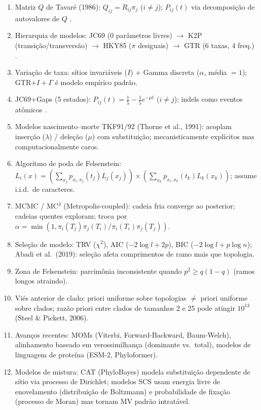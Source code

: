 \clearpage
\begin{revise}\small
\begin{enumerate}[itemsep=0pt, topsep=0pt, parsep=0pt]
    \item Matriz $Q$ de Tavaré (1986): $Q_{ij}=R_{ij}\pi_j$ ($i\neq j$); $P_{ij}(t)$ via decomposição de autovalores de $Q$ \parencite{tavare1986,yang1994}.
    \item Hierarquia de modelos: JC69 (0 parâmetros livres) $\to$ K2P (transição/transversão) $\to$ HKY85 ($\pi$ desiguais) $\to$ GTR (6 taxas, 4 freq.) \parencite{swofford1996}.
    \item Variação de taxa: sítios invariáveis ($I$) + Gamma discreta ($\alpha$, média $=1$); GTR$+I+\Gamma$ é modelo empírico padrão.
    \item JC69+Gaps (5 estados): $P_{ij}(t)=\frac{1}{5}-\frac{1}{5}e^{-\mu t}$ ($i\neq j$); indels como eventos atômicos \parencite{wheeler2006}.
    \item Modelos nascimento--morte TKF91/92 (Thorne et al., 1991): acoplam inserção ($\lambda$) / deleção ($\mu$) com substituição; mecanisticamente explícitos mas computacionalmente caros.
    \item Algoritmo de poda de Felsenstein: $L_i(x)=\left(\sum_{x_j}p_{x_i,x_j}(t_j)L_j(x_j)\right)\!\times\!\left(\sum_{x_k}p_{x_i,x_k}(t_k)L_k(x_k)\right)$; assume i.i.d.\ de caracteres.
    \item MCMC / MC$^3$ (Metropolis-coupled): cadeia fria converge ao posterior; cadeias quentes exploram; troca por $\alpha=\min(1,\pi_i(T_j)\pi_j(T_i)/\pi_i(T_i)\pi_j(T_j))$.
    \item Seleção de modelo: TRV ($\chi^2$), AIC ($-2\log l+2p$), BIC ($-2\log l+p\log n$); Abadi et al.\ (2019): seleção afeta comprimentos de ramo mais que topologia.
    \item Zona de Felsenstein: parcimônia inconsistente quando $p^2\geq q(1-q)$ (ramos longos atraindo).
    \item Viés anterior de clado: priori uniforme sobre topologias $\neq$ priori uniforme sobre clados; razão priori entre clados de tamanhos 2 e 25 pode atingir $10^{13}$ (Steel \& Pickett, 2006).
    \item Avanços recentes: MOMs (Viterbi, Forward-Backward, Baum-Welch), alinhamento baseado em verossimilhança (dominante vs.\ total), modelos de linguagem de proteína (ESM-2, Phyloformer).
    \item Modelos de mistura: CAT (PhyloBayes) modela substituição dependente de sítio via processo de Dirichlet; modelos SCS usam energia livre de enovelamento (distribuição de Boltzmann) e probabilidade de fixação (processo de Moran) mas tornam MV padrão intratável.

\end{enumerate}
\end{revise}
